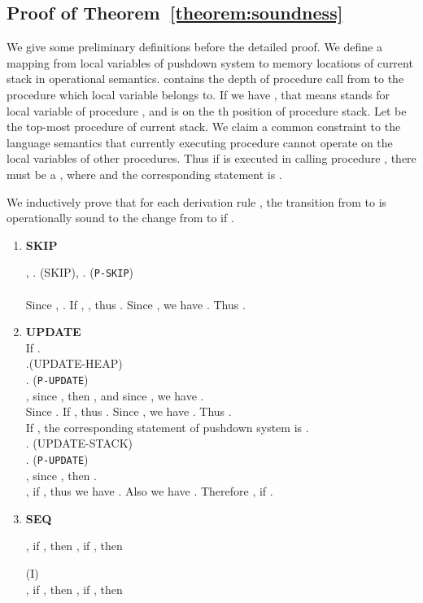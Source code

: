 \documentclass{llncs}
\begin{document}
\subsection*{Proof of Theorem~\ref{theorem:soundness}}
{\footnotesize

We give some preliminary definitions before the detailed proof. We
define a mapping  from local variables of pushdown system to
memory locations of current stack in operational semantics.
 contains the depth of procedure call from  to the
procedure which local variable belongs to. If we have
, that means  stands for local
variable  of procedure , and  is on the th position
of procedure stack. Let  be the top-most
procedure of current stack. We claim a common constraint to the
language semantics that currently executing procedure cannot operate
on the local variables of other procedures. Thus if
 is executed in calling
procedure , there must be a , where
 and the corresponding statement is
.

We inductively prove that for each derivation rule
, the transition from  to
 is operationally sound to the change from
 to  if
.

\begin{enumerate}[1.]
\item \textbf{SKIP}

, . (SKIP)\qquad , . (\texttt{P-SKIP})\\
\\
Since , . If ,
, thus . Since
, we have . Thus .
\item \textbf{UPDATE}\\
If .\\
.(UPDATE-HEAP)\\
.
(\texttt{P-UPDATE})\\
, since , then
, and since , we have
.\\
Since . If ,
thus . Since , we have
. Thus
.\\
If , the corresponding statement of
pushdown system is .\\
.
(UPDATE-STACK)\\
.
(\texttt{P-UPDATE})\\
, since
, then .\\
, if , thus we have
. Also we have
. Therefore , if .

\item \textbf{SEQ}

,
if , then
, if , then

\hfill (I)\\
,
if , then
, if , then


\end{enumerate}}
\end{document}
